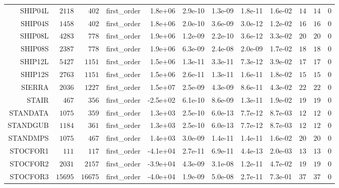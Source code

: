 \begin{longtable}{rrrrrrrrrrrr}
  SHIP04L & \(  2118\) & \(   402\) & first\_order &  1.8e+06 &  2.9e-10 &  1.3e-09 &  1.8e-11 &  1.6e-02 & \(    14\) & \(    14\) & \(     0\) \\
  SHIP04S & \(  1458\) & \(   402\) & first\_order &  1.8e+06 &  2.0e-10 &  3.6e-09 &  3.0e-12 &  1.2e-02 & \(    16\) & \(    16\) & \(     0\) \\
  SHIP08L & \(  4283\) & \(   778\) & first\_order &  1.9e+06 &  1.2e-09 &  2.2e-10 &  3.6e-12 &  3.3e-02 & \(    20\) & \(    20\) & \(     0\) \\
  SHIP08S & \(  2387\) & \(   778\) & first\_order &  1.9e+06 &  6.3e-09 &  2.4e-08 &  2.0e-09 &  1.7e-02 & \(    18\) & \(    18\) & \(     0\) \\
  SHIP12L & \(  5427\) & \(  1151\) & first\_order &  1.5e+06 &  1.3e-11 &  3.3e-11 &  7.3e-12 &  3.9e-02 & \(    17\) & \(    17\) & \(     0\) \\
  SHIP12S & \(  2763\) & \(  1151\) & first\_order &  1.5e+06 &  2.6e-11 &  1.3e-11 &  1.6e-11 &  1.8e-02 & \(    15\) & \(    15\) & \(     0\) \\
  SIERRA & \(  2036\) & \(  1227\) & first\_order &  1.5e+07 &  2.5e-09 &  4.3e-09 &  8.6e-11 &  4.3e-02 & \(    22\) & \(    22\) & \(     0\) \\
  STAIR & \(   467\) & \(   356\) & first\_order & -2.5e+02 &  6.1e-10 &  8.6e-09 &  1.3e-11 &  1.9e-02 & \(    19\) & \(    19\) & \(     0\) \\
  STANDATA & \(  1075\) & \(   359\) & first\_order &  1.3e+03 &  2.5e-10 &  6.0e-13 &  7.7e-12 &  8.7e-03 & \(    12\) & \(    12\) & \(     0\) \\
  STANDGUB & \(  1184\) & \(   361\) & first\_order &  1.3e+03 &  2.5e-10 &  6.0e-13 &  7.7e-12 &  8.7e-03 & \(    12\) & \(    12\) & \(     0\) \\
  STANDMPS & \(  1075\) & \(   467\) & first\_order &  1.4e+03 &  3.0e-09 &  1.4e-11 &  1.4e-11 &  1.6e-02 & \(    20\) & \(    20\) & \(     0\) \\
  STOCFOR1 & \(   111\) & \(   117\) & first\_order & -4.1e+04 &  2.7e-11 &  6.9e-11 &  4.4e-13 &  2.0e-03 & \(    13\) & \(    13\) & \(     0\) \\
  STOCFOR2 & \(  2031\) & \(  2157\) & first\_order & -3.9e+04 &  4.3e-09 &  3.1e-08 &  1.2e-11 &  4.7e-02 & \(    19\) & \(    19\) & \(     0\) \\
  STOCFOR3 & \( 15695\) & \( 16675\) & first\_order & -4.0e+04 &  1.9e-09 &  5.0e-08 &  2.7e-11 &  7.3e-01 & \(    37\) & \(    37\) & \(     0\) \\

\end{longtable}
